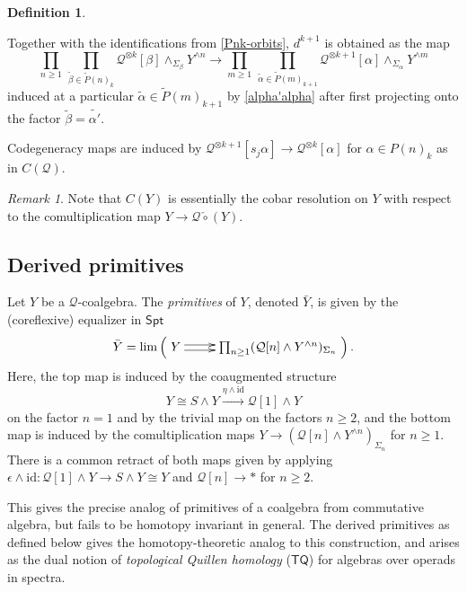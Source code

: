 \documentclass[12pt]{amsart}
\theoremstyle{definition}
\newtheorem{definition}[subsection]{Definition}
\theoremstyle{remark}
\newtheorem{remark}[subsection]{Remark}
\newcommand{\Spt}{\mathsf{Spt}}
\newcommand{\TQ}{\mathsf{TQ}}
\newcommand{\id}{\mathrm{id}}
\newcommand{\pt}{*}
\newcommand{\Cal}[1]{\mathcal{#1}}
\newcommand{\ccirc}{\check{\circ}}
\begin{document}
\begin{definition}
\begin{itemize}
    Together with the identifications from \eqref{Pnk-orbits}, $d^{k+1}$  is obtained as the map\begin{equation*}
        \prod_{n\geq 1} \,\prod_{\widetilde{\beta} \in \widetilde{P}(n)_k } \Cal{Q}^{\otimes k}[\beta]\wedge_{\Sigma_{\beta}} Y^{\wedge n} 
        \to
        \prod_{m\geq 1} \,\prod_{\widetilde{\alpha} \in \widetilde{P}(m)_{k+1} } \Cal{Q}^{\otimes k+1}[\alpha]\wedge_{\Sigma_{\alpha}} Y^{\wedge m}
    \end{equation*} induced at a particular $\widetilde{\alpha}\in \widetilde{P}(m)_{k+1}$ by \eqref{alpha'alpha} after first projecting onto the factor $\widetilde{\beta}=\widetilde{\alpha'}$. 
\end{itemize}
Codegeneracy maps are induced by $\Cal{Q}^{\otimes k+1}[s_j\alpha]\to \Cal{Q}^{\otimes k}[\alpha]$ for $\alpha\in P(n)_k$ as in $C(\Cal{Q})$.
\end{definition}

\begin{remark}
    Note that $C(Y)$ is essentially the cobar resolution on $Y$ with respect to the comultiplication map $Y\to \Cal{Q}\ccirc (Y)$.
\end{remark}
\subsection{Derived primitives} 
Let $Y$ be a $\Cal{Q}$-coalgebra. The \textit{primitives} of $Y$, denoted $\bar{Y}$, is given by the (coreflexive) equalizer in $\Spt$ \begin{equation} \label{eq:primitives}
    \bar{Y} = \lim \left( \xymatrix{ Y\ar@<.5ex>[r] \ar@<-.5ex>[r] & \prod_{n\geq 1} (\Cal{Q}[n]\wedge Y^{\wedge n})_{\Sigma_n}} \right). 
\end{equation}
Here, the top map is induced by the coaugmented structure \[Y\cong S\wedge Y\xrightarrow{\eta\wedge \id} \Cal{Q}[1]\wedge Y\]
on the factor $n=1$ and by the trivial map on the factors $n\geq 2$, and the bottom map is induced by the comultiplication maps $Y\to (\Cal{Q}[n]\wedge Y^{\wedge n})_{\Sigma_n}$ for $n\geq 1$. There is a common retract of both maps given by applying $\epsilon\wedge \id\colon \Cal{Q}[1]\wedge Y\to S\wedge Y\cong Y$ and $\Cal{Q}[n]\to \pt$ for $n\geq 2$. 

This gives the precise analog of primitives of a coalgebra from commutative algebra, but fails to be homotopy invariant in general. The derived primitives as defined below gives the homotopy-theoretic analog to this construction, and arises as the dual notion of \textit{topological Quillen homology} ($\TQ$) for algebras over operads in spectra. 
\end{document}
